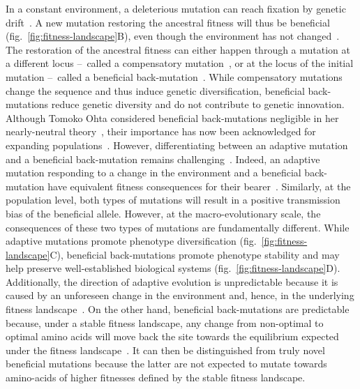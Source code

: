 \documentclass{article}
\begin{document}
    In a constant environment, a deleterious mutation can reach fixation by genetic drift~\cite{Ohta1992}.
    A new mutation restoring the ancestral fitness will thus be beneficial (fig.~\ref{fig:fitness-landscape}B), even though the environment has not changed~\cite{gillespie_ohta_1995, hartl_compensatory_1996, sella_application_2005, mustonen_fitness_2009, cvijovic_fate_2015}.
    The restoration of the ancestral fitness can either happen through a mutation at a different locus –~called a compensatory mutation~\cite{hartl_compensatory_1996, mustonen_fitness_2009}, or at the locus of the initial mutation –~called a beneficial back-mutation~\cite{piganeau_estimating_2003, charlesworth_other_2007}.
    While compensatory mutations change the sequence and thus induce genetic diversification, beneficial back-mutations reduce genetic diversity and do not contribute to genetic innovation.
    Although Tomoko Ohta considered beneficial back-mutations negligible in her nearly-neutral theory~\cite{Ohta1992}, their importance has now been acknowledged for expanding populations~\cite{charlesworth_other_2007}.
    However, differentiating between an adaptive mutation and a beneficial back-mutation remains challenging~\cite{chi_detecting_2020}.
    Indeed, an adaptive mutation responding to a change in the environment and a beneficial back-mutation have equivalent fitness consequences for their bearer~\cite{charlesworth_other_2007}.
    Similarly, at the population level, both types of mutations will result in a positive transmission bias of the beneficial allele.
    However, at the macro-evolutionary scale, the consequences of these two types of mutations are fundamentally different.
    While adaptive mutations promote phenotype diversification (fig.~\ref{fig:fitness-landscape}C), beneficial back-mutations promote phenotype stability and may help preserve well-established biological systems (fig.~\ref{fig:fitness-landscape}D).
    Additionally, the direction of adaptive evolution is unpredictable because it is caused by an unforeseen change in the environment and, hence, in the underlying fitness landscape~\cite{bazykin_changing_2015}.
    On the other hand, beneficial back-mutations are predictable because, under a stable fitness landscape, any change from non-optimal to optimal amino acids will move back the site towards the equilibrium expected under the fitness landscape~\cite{moses_inferring_2009, fischer_germline_2011, chen_hunting_2021}.
    It can then be distinguished from truly novel beneficial mutations because the latter are not expected to mutate towards amino-acids of higher fitnesses defined by the stable fitness landscape.
\end{document}
